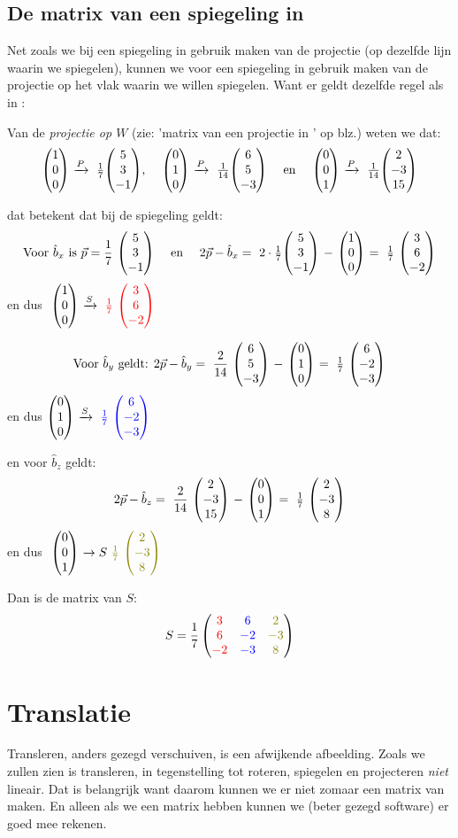 \subsection{De matrix van een spiegeling in \RD}
Net zoals we bij een spiegeling in \RT gebruik maken van de projectie (op dezelfde lijn waarin we spiegelen), kunnen we voor een spiegeling in \RD gebruik maken van de projectie op het vlak waarin we willen spiegelen. Want er geldt dezelfde regel als in \RT:

Van de \textit{projectie op $W$} (zie: 'matrix van een projectie in \RD' op blz.\pageref{projectieR3}) weten we dat:
\[
    \vecdrie{1}{0}{0} \ \xrightarrow{P}\ \frac{1}{7}  \vecdrie{5}{3}{-1} \text{, } \quad 
    \vecdrie{0}{1}{0} \ \xrightarrow{P}\ \frac{1}{14} \vecdrie{6}{5}{-3} \quad \text{ en } \quad 
    \vecdrie{0}{0}{1} \ \xrightarrow{P}\ \frac{1}{14} \vecdrie{2}{-3}{15}
\]

dat betekent dat bij de spiegeling geldt:
\[
    \text{Voor } \hat{b}_x \text{ is } \vec{p} = \frac{1}{7}\ \vecdrie{5}{3}{-1} \quad \text{ en } \quad 
    2\vec{p} - \hat{b}_x =\ 2\cdot \frac{1}{7} \vecdrie{5}{3}{-1} \ -\ \vecdrie{1}{0}{0} \ =\ \frac{1}{7}\ \vecdrie{3}{6}{-2} 
\]
en dus $ \ \vecdrie{1}{0}{0}   \  \xrightarrow{S}  \  { \color{red}\frac{1}{7}} \  \vecdrie[red] {3 } {6}{-2} $

\[
    \text{Voor } \hat{b}_y \text{ geldt: } 2\vec{p} - \hat{b}_y =\ \frac{2}{14}\ \vecdrie{6}{5}{-3} \ -\ \vecdrie{0}{1}{0} \ 
    =\ \frac{1}{7}\ \vecdrie{6}{-2}{-3}
\]
en dus \quad $\vecdrie{0}{1}{0} \ \xrightarrow{S}\ {\color{blue}\frac{1}{7}}\ \vecdrie[blue]{6}{-2}{-3} $

en voor $\hat{b}_z$ geldt: 
\[
    2\vec{p} -\hat{b}_z =\ \frac{2}{14}\ \vecdrie{2}{-3}{15} \ -\ \vecdrie{0}{0}{1} \ =\ \frac{1}{7}\ \vecdrie{2}{-3}{8}   
\]
en dus $\ \vecdrie{0}{0}{1} \ \rightarrow{S}\ {\color{olive}\frac{1}{7}} \ \vecdrie[olive]{2}{-3}{8} $

Dan is de matrix van $S$:
\[ 
    S = \frac{1}{7} \matdrie{ \red{3}  & \blu{6}  & \gre{2}  }
                            { \red{6}  & \blu{-2} & \gre{-3} }
                            { \red{-2} & \blu{-3} & \gre{8}}
\]

\section{Translatie}		
Transleren, anders gezegd verschuiven, is een afwijkende afbeelding. Zoals we zullen zien is transleren, in tegenstelling tot roteren, spiegelen en projecteren \textit{niet} lineair. Dat is belangrijk want daarom kunnen we er niet zomaar een matrix van maken. En alleen als we een matrix hebben kunnen we (beter gezegd software) er  goed mee rekenen. 
